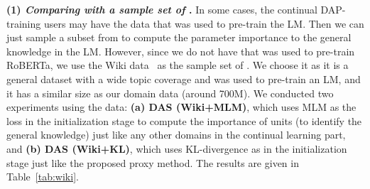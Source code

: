 \documentclass{article} \usepackage{iclr2023_conference,times}
\begin{document}
{\color{black}

{\color{black}\textbf{(1) \textit{Comparing with a sample set of }.}}
In some cases, the continual DAP-training users may have the data  that was used to pre-train the LM. Then we can just sample a subset from  to compute the parameter importance to the general knowledge in the LM. However, since we do not have  that was used to pre-train RoBERTa, we use the Wiki data~\citep{DBLP:conf/iclr/MerityX0S17} as the sample set of . We choose it as it is a general dataset with a wide topic coverage and was used to pre-train an LM, and it has a similar size as our domain data (around 700M). We conducted two experiments using the data: \textbf{(a) DAS (Wiki+MLM)}, which uses MLM as the loss in the initialization stage to compute the importance of units (to identify the general knowledge) just like any other domains in the continual learning part, and \textbf{(b) DAS (Wiki+KL)}, which uses KL-divergence as in the initialization stage just like the proposed proxy method. The results are given in Table~\ref{tab:wiki}. 



\begin{table*}[]
\centering
{}
\vspace{-3mm}
\caption{
{\color{black}Results for the Wiki dataset as the sample set of  - average of 5 random seeds}
} 
\vspace{-4mm}
\label{tab:wiki}
\end{table*}
 
}
\end{document}
